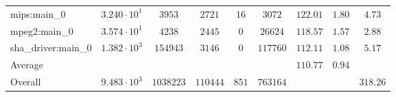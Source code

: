 \begin{tabular}{|l|c|c|c|c|c|c|c|c|}
mips:main\_0            & $ 3.240 \cdot 10^{1} $ & $ 3953    $ & $ 2721   $ & $ 16  $ & $ 3072   $ & $ 122.01      $ & $ 1.80    $ & $ 4.73    $ \\
mpeg2:main\_0           & $ 3.574 \cdot 10^{1} $ & $ 4238    $ & $ 2445   $ & $ 0   $ & $ 26624  $ & $ 118.57      $ & $ 1.57    $ & $ 2.88    $ \\
sha\_driver:main\_0     & $ 1.382 \cdot 10^{3} $ & $ 154943  $ & $ 3146   $ & $ 0   $ & $ 117760 $ & $ 112.11      $ & $ 1.08    $ & $ 5.17    $ \\
\hline
Average                 & $                    $ & $         $ & $        $ & $     $ & $        $ & $ 110.77      $ & $ 0.94    $ & $         $ \\
\hline
Overall                 & $ 9.483 \cdot 10^{3} $ & $ 1038223 $ & $ 110444 $ & $ 851 $ & $ 763164 $ & $             $ & $         $ & $ 318.26  $ \\
\hline
\end{tabular}
